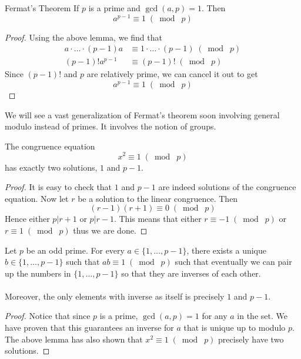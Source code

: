 \begin{thm}{Fermat's Theorem}{} If $p$ is a prime and $\gcd{(a,p)}=1$. Then $$a^{p-1}\equiv 1\;(\bmod\;p)$$ \tcbline
\begin{proof}
Using the above lemma, we find that 
\begin{align*}
a\cdot\dots\cdot(p-1)a&\equiv 1\cdot\dots\cdot(p-1)\;(\bmod\;p)\\
(p-1)!a^{p-1}&\equiv(p-1)!\;(\bmod\;p)
\end{align*}
Since $(p-1)!$ and $p$ are relatively prime, we can cancel it out to get $$a^{p-1}\equiv 1\;(\bmod\;p)$$
\end{proof}
\end{thm}

We will see a vast generalization of Fermat's theorem soon involving general modulo instead of primes. It involves the notion of groups. 

\begin{lmm}{}{} The congruence equation $$x^2\equiv 1\;(\bmod\;p)$$ has exactly two solutions, $1$ and $p-1$. \tcbline
\begin{proof}
It is easy to check that $1$ and $p-1$ are indeed solutions of the congruence equation. Now let $r$ be a solution to the linear congruence. Then $$(r-1)(r+1)\equiv 0\;(\bmod\;p)$$ Hence either $p|r+1$ or $p|r-1$. This means that either $r\equiv-1\;(\bmod\;p)$ or $r\equiv 1\;(\bmod\;p)$ thus we are done. 
\end{proof}
\end{lmm}

\begin{lmm}{}{} Let $p$ be an odd prime. For every $a\in\{1,\dots,p-1\}$, there exists a unique $b\in\{1,\dots,p-1\}$ such that $ab\equiv 1\;(\bmod\;p)$ such that eventually we can pair up the numbers in $\{1,\dots,p-1\}$ so that they are inverses of each other. \\~\\
Moreover, the only elements with inverse as itself is precisely $1$ and $p-1$. \tcbline
\begin{proof}
Notice that since $p$ is a prime, $\gcd(a,p)=1$ for any $a$ in the set. We have proven that this guarantees an inverse for $a$ that is unique up to modulo $p$. The above lemma has also shown that $x^2\equiv 1\;(\bmod\;p)$ precisely have two solutions. 
\end{proof}
\end{lmm}


